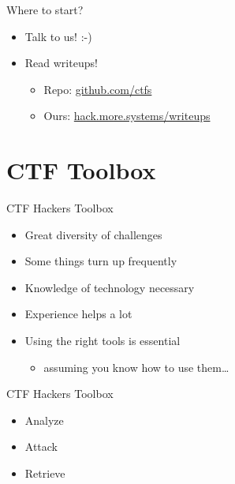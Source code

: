 \begin{frame}
	{Where to start?}

	\begin{itemize}
		\item Talk to us! :-)
	\end{itemize}

	\begin{itemize}
		\item Read writeups!
		\begin{itemize}
			\item Repo: \href{https://github.com/ctfs}{github.com/ctfs}
			\item Ours: \href{https://hack.more.systems/writeups}{hack.more.systems/writeups}
		\end{itemize}
	\end{itemize}

\end{frame}

\section{CTF Toolbox}

\begin{frame}
  {CTF Hackers Toolbox}

  \begin{itemize}
    \item Great diversity of challenges
    \item Some things turn up frequently
    \item Knowledge of technology necessary
    \item Experience helps a lot
  \end{itemize}

  \begin{itemize}
    \item Using the right tools is essential
      \begin{itemize}
        \item assuming you know how to use them\ldots
      \end{itemize}
  \end{itemize}

\end{frame}

\begin{frame}
	{CTF Hackers Toolbox}

	\begin{itemize}
		\item Analyze
		\item Attack
		\item Retrieve
	\end{itemize}

\end{frame}

